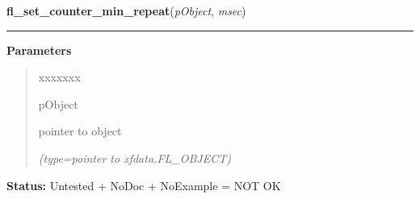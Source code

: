 \hspace{.8\funcindent}\begin{boxedminipage}{\funcwidth}

    \raggedright \textbf{fl\_set\_counter\_min\_repeat}(\textit{pObject}, \textit{msec})

    \vspace{-1.5ex}

    \rule{\textwidth}{0.5\fboxrule}
\setlength{\parskip}{2ex}
\setlength{\parskip}{1ex}
      \textbf{Parameters}
      \vspace{-1ex}

      \begin{quote}
        \begin{Ventry}{xxxxxxx}

          \item[pObject]

          pointer to object

            {\it (type=pointer to xfdata.FL\_OBJECT)}

        \end{Ventry}

      \end{quote}

\textbf{Status:} Untested + NoDoc + NoExample = NOT OK



    \end{boxedminipage}

    \label{xformslib:library:fl_get_counter_speedjump}

    \vspace{0.5ex}

